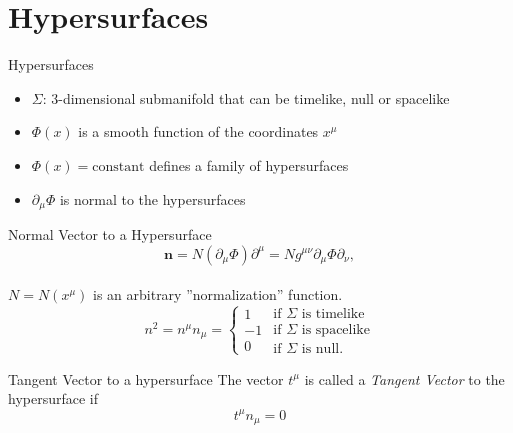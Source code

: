 \documentclass{beamer}
\begin{document}
	\section{Hypersurfaces}    
  	\begin{darkframes}
        
        \begin{frame}{Hypersurfaces}
        	\begin{itemize}
            \item $\Sigma$: 3-dimensional submanifold that can be timelike, null or spacelike
            \pause
            \item $\Phi\left(x\right)$ is a smooth function of the coordinates $x^{\mu}$
            \pause
            \item $\Phi\left(x\right)=\textrm{constant}$ defines a family of hypersurfaces 
            \pause
            \item $\partial_{\mu}\Phi$ is normal to the hypersurfaces
        	\end{itemize}
            
        \end{frame}
        
        \begin{frame}{Normal Vector to a Hypersurface}
        	\begin{equation*}
            	\mathbf{n} =	N\left(\partial_{\mu}\Phi\right)\partial^{\mu}	=	
                Ng^{\mu\nu}\partial_{\mu}\Phi\partial_{\nu},\label{eq:vectorNormal}
			\end{equation*}\\
            \pause
 			$N=N\left(x^{\mu}\right)$ is an arbitrary ''normalization'' function.
            \pause
			\begin{equation*}
				n^{2}=n^{\mu}n_{\mu} = \left\{ \begin{array}{c}
				1\\
				-1\\
				0
				\end{array}\right.\begin{array}{c}
				\mbox{if }\Sigma\mbox{ is timelike}\\
				\mbox{if }\Sigma\mbox{ is spacelike}\\
				\mbox{if }\Sigma\mbox{ is null.}
				\end{array}
			\end{equation*}
        \end{frame}
        
    	\begin{frame}{Tangent Vector to a hypersurface}
        	The vector $ t^{\mu} $ is called a \textit{Tangent Vector} to the hypersurface if
    		$$ t^{\mu}n_{\mu}=0 $$
    	\end{frame}
	

\end{darkframes}
\end{document}
